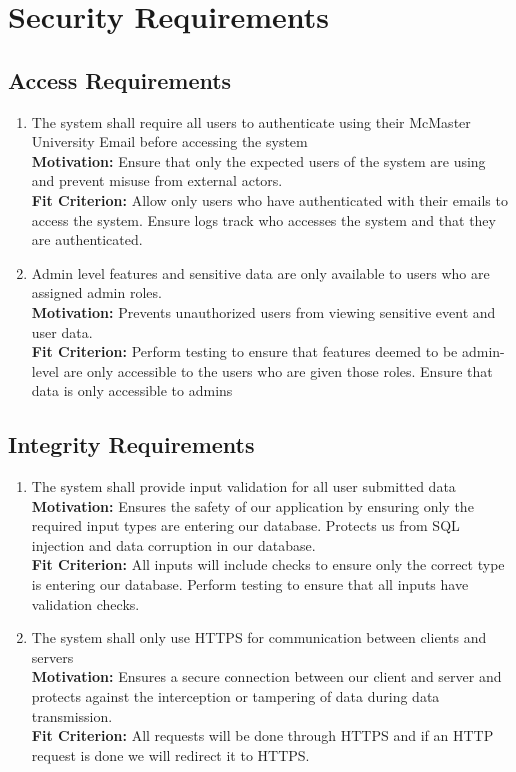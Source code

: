 \documentclass[12pt]{article}
\begin{document}
\section{Security Requirements}
\subsection{Access Requirements}
\begin{enumerate}[align=left,
  leftmargin=*,
  labelsep=1em,
  itemindent=0em,
  label=\bfseries AC-\arabic*:]
  \item \label{SAR1} The system shall require all users to authenticate using their McMaster University Email before accessing the system \\[2mm]
    {\bf Motivation:} Ensure that only the expected users of the system are using and prevent misuse from external actors.  \\
    {\bf Fit Criterion:} Allow only users who have authenticated with their emails to access the system. Ensure logs track who accesses the system and that they are authenticated.
  \item \label{SAR2} Admin level features and sensitive data are only available to users who are assigned admin roles. \\ [2mm]
    {\bf Motivation:} Prevents unauthorized users from viewing sensitive event and user data.  \\
    {\bf Fit Criterion:} Perform testing to ensure that features deemed to be admin-level are only accessible to the users who are given those roles. Ensure that data is only accessible to admins
\end{enumerate}
\subsection{Integrity Requirements}
\begin{enumerate}[align=left,
  leftmargin=*,
  labelsep=1em,
  itemindent=0em,
  label=\bfseries IG-\arabic*:]
  \item \label{SIR1} The system shall provide input validation for all user submitted data \\[2mm]
    {\bf Motivation:} Ensures the safety of our application by ensuring only the required input types are entering our database. Protects us from SQL injection and data corruption in our database.  \\
    {\bf Fit Criterion:} All inputs will include checks to ensure only the correct type is entering our database. Perform testing to ensure that all inputs have validation checks.
  \item \label{SIR2} The system shall only use HTTPS for communication between clients and servers \\[2mm]
    {\bf Motivation:} Ensures a secure connection between our client and server and protects against the interception or tampering of data during data transmission. \\
    {\bf Fit Criterion:} All requests will be done through HTTPS and if an HTTP request is done we will redirect it to HTTPS. \\
\end{enumerate}
\end{document}
